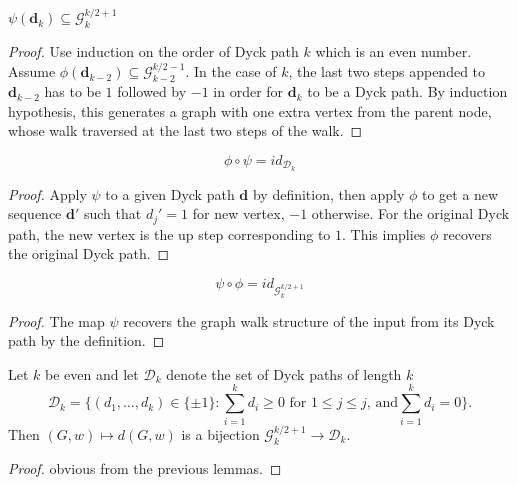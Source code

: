 \begin{lemma}
    \notready
    \label{lem:Dyck_graph_correspondence}
  $\psi(\mathbf{d}_k) \subseteq \mathcal{G}^{k/2 + 1}_k$
  \begin{proof}
    \notready
    Use induction on the order of Dyck path $k$ which is an even number. Assume $\phi(\mathbf{d}_{k-2})
    \subseteq \mathcal{G}_{k-2}^{k/2 -1}$. In the case of $k$, the last two steps appended to $\mathbf{d}_{k-2}$
    has to be $1$ followed by $-1$ in order for $\mathbf{d}_k$ to be a Dyck path. By induction hypothesis,
    this generates a graph with one extra vertex from the parent node, whose walk traversed at the last two steps of the walk.
  \end{proof}
\end{lemma}


\begin{lemma}
    \notready
    \label{lem:composition1}
  $$\phi \circ \psi = id_{\mathcal{D}_k}$$
  \begin{proof}
    \notready
    Apply $\psi$ to a given Dyck path $\mathbf{d}$ by definition, then apply $\phi$ to get a new sequence
    $\mathbf{d}'$ such that $d_j' = 1$ for new vertex, $-1$ otherwise. For the original Dyck path, the new
    vertex is the up step corresponding to $1$. This implies $\phi$ recovers the original Dyck path.
  \end{proof}
\end{lemma}


\begin{lemma}
    \notready
    \label{lem:composition2}
  $$\psi \circ \phi = id_{\mathcal{G}^{k/2 + 1}_k}$$
   \begin{proof}
    \notready
    The map $\psi$ recovers the graph walk structure of the input from its Dyck path by the definition.
  \end{proof}
\end{lemma}


\begin{lemma}
    \notready
    \label{lem:walk_to_Dyck_paths_bijection}
  Let $k$ be even and let $\mathcal{D}_k$ denote the set of Dyck paths of length $k$
  \[ \mathcal{D}_k = \{(d_1,\ldots,d_k)\in\{\pm 1\}\colon \sum_{i=1}^k d_i\ge 0\text{ for }1\le j\le j\text{, and}\sum_{i=1}^kd_i=0\}. \]
  Then $(G,w)\mapsto {d}(G,w)$ is a bijection $\mathcal{G}_k^{k/2+1}\to\mathcal{D}_k$.
  \begin{proof}
    \notready
    obvious from the previous lemmas.
  \end{proof}
\end{lemma}

